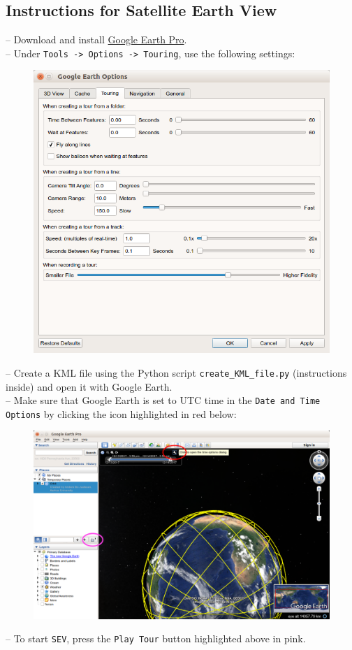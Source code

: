 \documentclass[10pt,a4paper]{article}
\begin{document}
\subsection{Instructions for Satellite Earth View}
-- Download and install \href{https://earth.google.com/download-earth.html}{Google Earth Pro}.\\
-- Under \texttt{Tools -> Options -> Touring}, use the following settings:\\
%
\begin{figure}[H]
\includegraphics[width=1.0\textwidth]{../GoogleEarthSettings.png}
\end{figure}
%
\noindent -- Create a KML file using the Python script \texttt{create\_KML\_file.py} (instructions inside) and open it with Google Earth.\\
-- Make sure that Google Earth is set to UTC time in the \texttt{Date and Time Options} by clicking the icon highlighted in red below:\\
%
\begin{figure}[H]
\includegraphics[width=1.0\textwidth]{../DateTime_PlayTour.png}
\end{figure}
%
\noindent -- To start \texttt{SEV}, press the \texttt{Play Tour} button highlighted above in pink.\\
\end{document}
